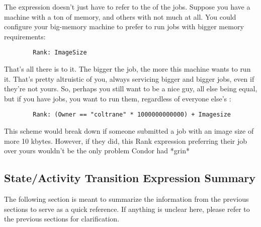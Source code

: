 The  expression doesn't just have to refer to the
 of the jobs.  Suppose you have a machine with a ton of
memory, and others with not much at all.  You could configure your
big-memory machine to prefer to run jobs with bigger memory
requirements:

\begin{verbatim}
        Rank: ImageSize
\end{verbatim}

That's all there is to it.  The bigger the job, the more this machine
wants to run it.  That's pretty altruistic of you, always servicing
bigger and bigger jobs, even if they're not yours.  So, perhaps you
still want to be a nice guy, all else being equal, but if you have
jobs, you want to run them, regardless of everyone else's
:

\begin{verbatim}
        Rank: (Owner == "coltrane" * 1000000000000) + Imagesize
\end{verbatim}

This scheme would break down if someone submitted a job with an image
size of more 10 kbytes.  However, if they did, this Rank expression
preferring their job over yours wouldn't be the only problem Condor had
*grin* 


\subsection{ State/Activity Transition Expression Summary}
\label{sec:State-Expression-Summary}
The following section is meant to summarize the information from the
previous sections to serve as a quick reference.  If anything is
unclear here, please refer to the previous sections for clarification.

